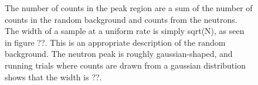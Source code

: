 \begin{figure}[ht]
\centering
  
  

  \caption{The number of counts in the peak region are a sum of the number of counts in the random background and counts from the neutrons.  The width of a sample at a uniform rate is simply sqrt(N), as seen in figure ??.  This is an appropriate description of the random background.  The neutron peak is roughly gaussian-shaped, and running trials where counts are drawn from a gaussian distribution shows that the width is ??.}
  \label{fig:statDist}
\end{figure}

